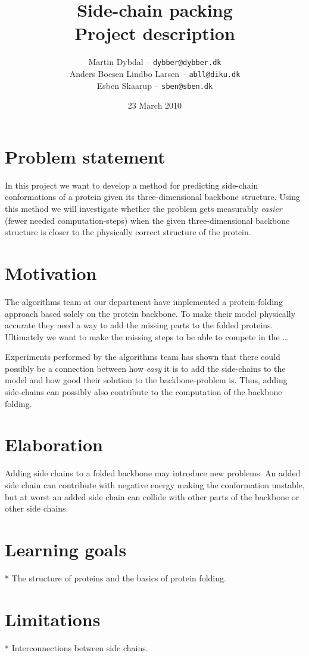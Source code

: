 \documentclass[10pt,a4paper,final,oneside,openany,article]{memoir}
\title{
  Side-chain packing \\
  \small{Project description}
}
\author{
	Martin Dybdal -- \texttt{dybber@dybber.dk}\\
	Anders Boesen Lindbo Larsen -- \texttt{abll@diku.dk} \\
    Esben Skaarup -- \texttt{sben@sben.dk}
}
\date{23 March 2010}
\begin{document}
\maketitle

\section{Problem statement}
In this project we want to develop a method for predicting side-chain
conformations of a protein given its three-dimensional backbone
structure. Using this method we will investigate whether the
problem gets measurably \textit{easier} (fewer needed
computation-steps) when the given three-dimensional backbone structure
is closer to the physically correct structure of the protein.

\section{Motivation}
The algorithms team at our department have implemented a
protein-folding approach based solely on the protein backbone. To make
their model physically accurate they need a way to add the missing
parts to the folded proteins. Ultimately we want to make the missing
steps to be able to compete in the \ldots{}

Experiments performed by the algorithms team has shown that there
could possibly be a connection between how \textit{easy} it is to add
the side-chains to the model and how good their solution to the
backbone-problem is. Thus, adding side-chains can possibly also
contribute to the computation of the backbone folding.

\section{Elaboration}
Adding side chains to a folded backbone may introduce new problems. An
added side chain can contribute with negative energy making the
conformation unstable, but at worst an added side chain can collide
with other parts of the backbone or other side chains.

\section{Learning goals}
* The structure of proteins and the basics of protein folding.

\section{Limitations}
* Interconnections between side chains.

\end{document}
